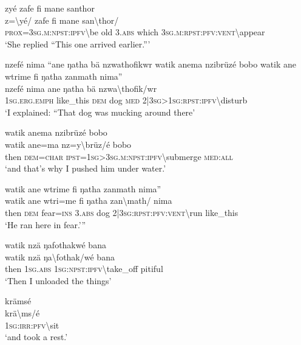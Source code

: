 \ea\label{ex:13:a1451}
zyé zafe fi mane santhor\\
\gll z={\textbackslash}yé/	zafe	fi	mane	san{\textbackslash}thor/\\
     \textsc{prox}=3\textsc{sg}.\textsc{m}:\textsc{npst}:\textsc{ipfv}{\textbackslash}be	old	3.\textsc{abs}	which	3\textsc{sg}.\textsc{m}:\textsc{rpst}:\textsc{pfv}:\textsc{vent}{\textbackslash}appear\\
\glt `She replied ``This one arrived earlier.'''
\z

\ea\label{ex:13:a1452}
nzefé nima ``ane ŋatha bä nzwathofikwr watik anema nzibrüzé bobo watik ane wtrime fi ŋatha zanmath nima''\\
\gll nzefé	nima	ane	ŋatha	bä	nzwa{\textbackslash}thofik/wr\\
     1\textsc{sg}.\textsc{erg}.\textsc{emph}	like\_this	\textsc{dem}	dog	\textsc{med}	2|3\textsc{sg}>1\textsc{sg}:\textsc{rpst}:\textsc{ipfv}{\textbackslash}disturb\\
\glt `I explained: ``That dog was mucking around there'
\z

\ea\label{ex:13:a4932}
watik anema nzibrüzé bobo\\
\gll watik	ane=ma	nz=y{\textbackslash}brüz/é	bobo\\
     then	\textsc{dem}=\textsc{char}	\textsc{ipst}=1\textsc{sg}>3\textsc{sg}.\textsc{m}:\textsc{npst}:\textsc{ipfv}{\textbackslash}submerge	\textsc{med}:\textsc{all}\\
\glt `and that's why I pushed him under water.'
\z

\ea\label{ex:13:a4933}
watik ane wtrime fi ŋatha zanmath nima''\\
\gll watik	ane	wtri=me	fi	ŋatha	zan{\textbackslash}math/	nima\\
     then	\textsc{dem}	fear=\textsc{ins}	3.\textsc{abs}	dog	2|3\textsc{sg}:\textsc{rpst}:\textsc{pfv}:\textsc{vent}{\textbackslash}run	like\_this\\
\glt `He ran here in fear.'''
\z

\ea\label{ex:13:a1453}
watik nzä ŋafothakwé bana\\
\gll watik	nzä	ŋa{\textbackslash}fothak/wé	bana\\
     then	1\textsc{sg}.\textsc{abs}	1\textsc{sg}:\textsc{npst}:\textsc{ipfv}{\textbackslash}take\_off	pitiful\\
\glt `Then I unloaded the things'
\z

\ea\label{ex:13:a1455}
krämsé\\
\gll krä{\textbackslash}ms/é\\
     1\textsc{sg}:\textsc{irr}:\textsc{pfv}{\textbackslash}sit\\
\glt `and took a rest.'
\z

